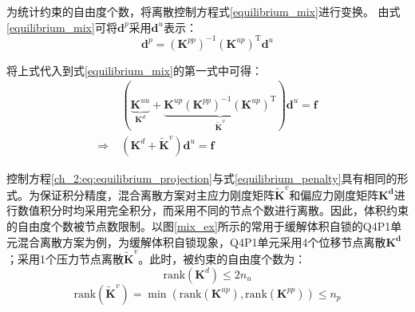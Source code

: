 为统计约束的自由度个数，将离散控制方程式\eqref{equilibrium_mix}进行变换。
由式\eqref{equilibrium_mix}可将$\boldsymbol d^p$采用$\boldsymbol d^u$表示：
\begin{equation}
    \boldsymbol d^p = (\boldsymbol K^{pp})^{-1} (\boldsymbol K^{up})^{\mathrm T} \boldsymbol d^u
\end{equation}

将上式代入到式\eqref{equilibrium_mix}的第一式中可得：
\begin{equation}\label{ch_2:eq:equilibrium_projection}
    \begin{split}
        &(\underbrace{\boldsymbol K^{uu}}_{\boldsymbol K^d} +  \underbrace{\boldsymbol K^{up}(\boldsymbol K^{pp})^{-1}(\boldsymbol K^{up})^{\mathrm T}}_{\tilde{\boldsymbol K}^v}) \boldsymbol d^u = \boldsymbol f \\
        \Rightarrow\;& (\boldsymbol K^d + \tilde{\boldsymbol K}^v) \boldsymbol d^u= \boldsymbol f
    \end{split}
\end{equation}

控制方程\eqref{ch_2:eq:equilibrium_projection}与式\eqref{equilibrium_penalty}具有相同的形式。为保证积分精度，混合离散方案对主应力刚度矩阵$\tilde{\boldsymbol K}^v$和偏应力刚度矩阵$\boldsymbol{K^d}$进行数值积分时均采用完全积分，而采用不同的节点个数进行离散。因此，体积约束的自由度个数被节点数限制。以图\ref{mix_ex}所示的常用于缓解体积自锁的Q4P1单元混合离散方案为例，为缓解体积自锁现象，Q4P1单元采用4个位移节点离散$\boldsymbol{K^d}$；采用1个压力节点离散$\tilde{\boldsymbol K}^v$。此时，被约束的自由度个数为：
\begin{equation}
    \mathrm{rank}(\boldsymbol K^d)\le 2n_u
\end{equation}
\begin{equation}
    \mathrm{rank}(\tilde{\boldsymbol K}^v)=\min(\mathrm{rank}({\boldsymbol K}^{up}),\mathrm{rank}({\boldsymbol K}^{pp}))\le n_p
\end{equation}

